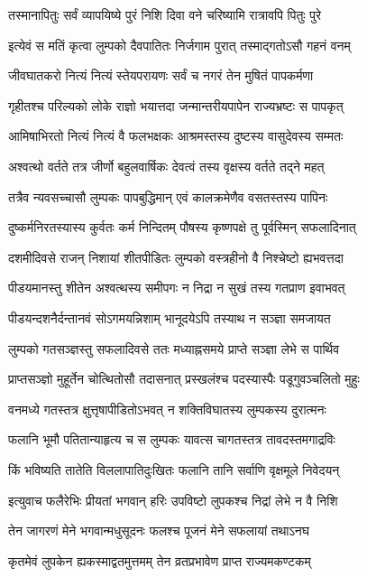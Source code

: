 \twolineshloka
{तस्मानापितुः सर्वं व्यापयिष्ये पुरं निशि}
{दिवा वने चरिष्यामि रात्रावपि पितुः पुरे} %

\twolineshloka
{इत्येवं स मतिं कृत्वा लुम्पको दैवपातितः}
{निर्जगाम पुरात् तस्माद्गतोऽसौ गहनं वनम्} %

\twolineshloka
{जीवघातकरो नित्यं नित्यं स्तेयपरायणः}
{सर्वं च नगरं तेन मुषितं पापकर्मणा} %

\twolineshloka
{गृहीतश्च परिल्यको लोके राज्ञो भयात्तदा}
{जन्मान्तरीयपापेन राज्यभ्रष्टः स पापकृत्} %

\twolineshloka
{आमिषाभिरतो नित्यं नित्यं वै फलभक्षकः}
{आश्रमस्तस्य दुष्टस्य वासुदेवस्य सम्मतः} %

\twolineshloka
{अश्वत्थो वर्तते तत्र जीर्णो बहुलवार्षिकः}
{देवत्वं तस्य वृक्षस्य वर्तते तद्ने महत्} %

\twolineshloka
{तत्रैव न्यवसच्चासौ लुम्पकः पापबुद्धिमान्}
{एवं कालक्रमेणैव वसतस्तस्य पापिनः} %

\twolineshloka
{दुष्कर्मनिरतस्यास्य कुर्वतः कर्म निन्दितम्}
{पौषस्य कृष्णपक्षे तु पूर्वस्मिन् सफलादिनात्} %

\twolineshloka
{दशमीदिवसे राजन् निशायां शीतपीडितः}
{लुम्पको वस्त्रहीनो वै निश्चेष्टो ह्यभवत्तदा} %

\twolineshloka
{पीडयमानस्तु शीतेन अश्वत्थस्य समीपगः}
{न निद्रा न सुखं तस्य गतप्राण इवाभवत्} %

\twolineshloka
{पीडयन्दशनैर्दन्तानवं सोऽगमयन्निशाम्}
{भानूदयेऽपि तस्याथ न सञ्ज्ञा समजायत} %

\twolineshloka
{लुम्पको गतसञ्ज्ञस्तु सफलादिवसे ततः}
{मध्याह्नसमये प्राप्ते सञ्ज्ञा लेभे स पार्थिव} %

\twolineshloka
{प्राप्तसञ्ज्ञो मुहूर्तेन चोत्थितोसौ तदासनात्}
{प्रस्खलंश्च पदस्यास्पैः पडूगुवञ्चलितो मुहुः} %

\twolineshloka
{वनमध्ये गतस्तत्र क्षुत्तृषापीडितोऽभवत्}
{न शक्तिविघातस्य लुम्पकस्य दुरात्मनः} %

\twolineshloka
{फलानि भूमौ पतितान्याहृत्य च स लुम्पकः}
{यावत्स चागतस्तत्र तावदस्तमगाद्रविः} %

\twolineshloka
{किं भविष्यति तातेति विललापातिदुःखितः}
{फलानि तानि सर्वाणि वृक्षमूले निवेदयन्} %

\twolineshloka
{इत्युवाच फलैरेभिः प्रीयतां भगवान् हरिः}
{उपविष्टो लुपकश्च निद्रां लेभे न वै निशि} %

\twolineshloka
{तेन जागरणं मेने भगवान्मधुसूदनः}
{फलश्च पूजनं मेने सफलायां तथाऽनघ} %

\twolineshloka
{कृतमेवं लुपकेन ह्यकस्माद्वतमुत्तमम्}
{तेन व्रतप्रभावेण प्राप्त राज्यमकण्टकम्} %

